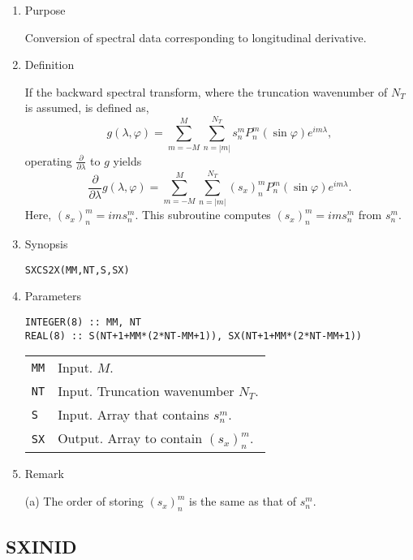 \documentclass[a4paper]{scrartcl}
\begin{document}
\begin{enumerate}

\item Purpose   

Conversion of spectral data 
corresponding to longitudinal derivative.

\item Definition

If the backward spectral transform, where the truncation
wavenumber of $N_T$ is assumed, is defined as,
\begin{equation}
g(\lambda,\varphi)=\sum^M_{m=-M}\sum^{N_T}_{n=|m|}
s^m_nP^m_n(\sin\varphi)e^{im\lambda},
\end{equation}
operating $\frac{\partial}{\partial\lambda}$ to $g$
yields
\begin{equation}
\frac{\partial}{\partial\lambda}
g(\lambda,\varphi)=\sum^M_{m=-M}\sum^{N_T}_{n=|m|}
(s_x)^m_nP^m_n(\sin\varphi)e^{im\lambda}.
\end{equation}
Here, $(s_x)^m_n=ims^m_n$.
This subroutine computes $(s_x)^m_n=ims^m_n$ from $s^m_n$.

\item Synopsis 
  
\texttt{SXCS2X(MM,NT,S,SX)}
  
\item Parameters

\begin{verbatim}
INTEGER(8) :: MM, NT
REAL(8) :: S(NT+1+MM*(2*NT-MM+1)), SX(NT+1+MM*(2*NT-MM+1))
\end{verbatim}

\begin{tabular}{ll}
\texttt{MM} & Input. $M$.\\  
\texttt{NT} & Input. Truncation wavenumber $N_T$.\\
\texttt{S} & Input. Array that contains $s^m_n$.\\
\texttt{SX} & Output. Array to contain $(s_x)^m_n$.
\end{tabular}

\item Remark

(a) The order of storing $(s_x)^m_n$ is the same as that of $s^m_n$.  
    
\end{enumerate}


\subsection{SXINID}
\end{document}
